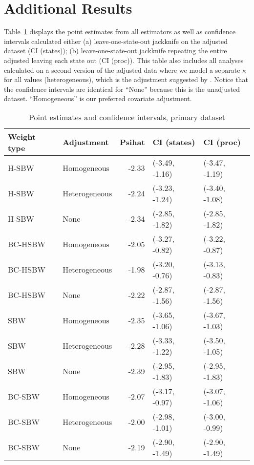 \section{Additional Results}
\label{ssec:allresults}

Table~\ref{tab:confintmain} displays the point estimates from all estimators as well as confidence intervals calculated either (a) leave-one-state-out jackknife on the adjusted dataset (CI (states)); (b) leave-one-state-out jackknife repeating the entire adjusted leaving each state out (CI (proc)). This table also includes all analyses calculated on a second version of the adjusted data where we model a separate $\kappa$ for all values (heterogeneous), which is the adjustment suggested by \cite{carroll2006measurement}. Notice that the confidence intervals are identical for ``None'' because this is the unadjusted dataset. ``Homogeneous'' is our preferred covariate adjustment.

\begin{table}[ht]
\centering
\caption{Point estimates and confidence intervals, primary dataset}
\label{tab:confintmain}
\begin{tabular}{llrll}
  \hline
Weight type & Adjustment & Psihat & CI (states) & CI (proc) \\ 
  \hline
H-SBW & Homogeneous & -2.33 & (-3.49, -1.16) & (-3.47, -1.19) \\ 
  H-SBW & Heterogeneous & -2.24 & (-3.23, -1.24) & (-3.40, -1.08) \\ 
  H-SBW & None & -2.34 & (-2.85, -1.82) & (-2.85, -1.82) \\ 
  BC-HSBW & Homogeneous & -2.05 & (-3.27, -0.82) & (-3.22, -0.87) \\ 
  BC-HSBW & Heterogeneous & -1.98 & (-3.20, -0.76) & (-3.13, -0.83) \\ 
  BC-HSBW & None & -2.22 & (-2.87, -1.56) & (-2.87, -1.56) \\ 
  SBW & Homogeneous & -2.35 & (-3.65, -1.06) & (-3.67, -1.03) \\ 
  SBW & Heterogeneous & -2.28 & (-3.33, -1.22) & (-3.50, -1.05) \\ 
  SBW & None & -2.39 & (-2.95, -1.83) & (-2.95, -1.83) \\ 
  BC-SBW & Homogeneous & -2.07 & (-3.17, -0.97) & (-3.07, -1.06) \\ 
  BC-SBW & Heterogeneous & -2.00 & (-2.98, -1.01) & (-3.00, -0.99) \\ 
  BC-SBW & None & -2.19 & (-2.90, -1.49) & (-2.90, -1.49) \\ 
   \hline
\end{tabular}
\end{table}


